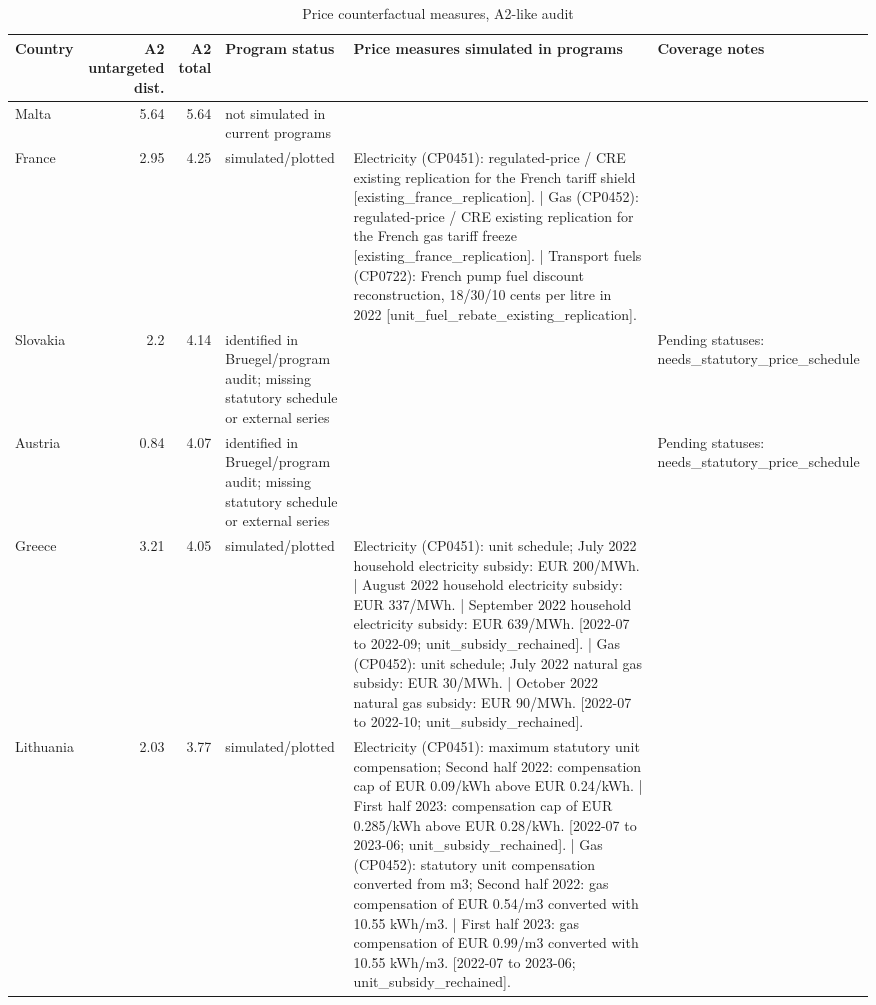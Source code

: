 \begin{table}[H]
\centering
\caption{Price counterfactual measures, A2-like audit}
\scriptsize
\setlength{\tabcolsep}{3pt}
\begin{tabular}{lrrp{}p{}p{}}
\toprule
Country & \shortstack{A2 untargeted\\dist.} & \shortstack{A2\\total} & Program status & Price measures simulated in programs & Coverage notes \\
\midrule
Malta & 5.64 & 5.64 & not simulated in current programs &  &  \\
France & 2.95 & 4.25 & simulated/plotted & Electricity (CP0451): regulated-price / CRE existing replication for the French tariff shield [existing\_france\_replication]. | Gas (CP0452): regulated-price / CRE existing replication for the French gas tariff freeze [existing\_france\_replication]. | Transport fuels (CP0722): French pump fuel discount reconstruction, 18/30/10 cents per litre in 2022 [unit\_fuel\_rebate\_existing\_replication]. &  \\
Slovakia & 2.2 & 4.14 & identified in Bruegel/program audit; missing statutory schedule or external series &  & Pending statuses: needs\_statutory\_price\_schedule \\
Austria & 0.84 & 4.07 & identified in Bruegel/program audit; missing statutory schedule or external series &  & Pending statuses: needs\_statutory\_price\_schedule \\
Greece & 3.21 & 4.05 & simulated/plotted & Electricity (CP0451): unit schedule; July 2022 household electricity subsidy: EUR 200/MWh. | August 2022 household electricity subsidy: EUR 337/MWh. | September 2022 household electricity subsidy: EUR 639/MWh. [2022-07 to 2022-09; unit\_subsidy\_rechained]. | Gas (CP0452): unit schedule; July 2022 natural gas subsidy: EUR 30/MWh. | October 2022 natural gas subsidy: EUR 90/MWh. [2022-07 to 2022-10; unit\_subsidy\_rechained]. &  \\
Lithuania & 2.03 & 3.77 & simulated/plotted & Electricity (CP0451): maximum statutory unit compensation; Second half 2022: compensation cap of EUR 0.09/kWh above EUR 0.24/kWh. | First half 2023: compensation cap of EUR 0.285/kWh above EUR 0.28/kWh. [2022-07 to 2023-06; unit\_subsidy\_rechained]. | Gas (CP0452): statutory unit compensation converted from m3; Second half 2022: gas compensation of EUR 0.54/m3 converted with 10.55 kWh/m3. | First half 2023: gas compensation of EUR 0.99/m3 converted with 10.55 kWh/m3. [2022-07 to 2023-06; unit\_subsidy\_rechained]. &  \\

\end{tabular}
\end{table}
